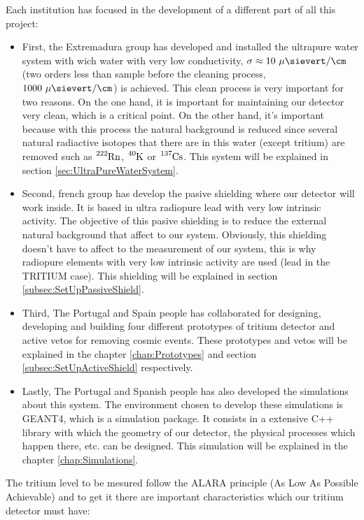 Each institution has focused in the development of a different part of all this project:
\begin{itemize}
\item{} First, the Extremadura group has developed and installed the ultrapure water system with wich water with very low conductivity, $\sigma \approx 10~\mu\sievert/\cm$ (two orders less than sample before the cleaning process, $1000~\mu\sievert/\cm$) is achieved. This clean process is very important for two reasons. On the one hand, it is important for maintaining our detector very clean, which is a critical point. On the other hand, it's important because with this process the natural background is reduced since several natural radiactive isotopes that there are in this water (except tritium) are removed such as $\ce{^{222}Rn}$, $\ce{^{40}K}$ or $\ce{^{137}Cs}$. This system will be explained in section \ref{sec:UltraPureWaterSystem}.

\item{} Second, french group has develop the pasive shielding where our detector will work inside. It is based in ultra radiopure lead with very low intrinsic activity. The objective of this pasive shielding is to reduce the external natural background that affect to our system. Obviously, this shielding doesn't have to affect to the measurement of our system, this is why radiopure elements with very low intrinsic activity are used (lead in the TRITIUM case). This shielding will be explained in section \ref{subsec:SetUpPassiveShield}.

\item{} Third, The Portugal and Spain people has collaborated for designing, developing and building four different prototypes of tritium detector and active vetos for removing cosmic events. These prototypes and vetos will be explained in the chapter \ref{chap:Prototypes} and section \ref{subsec:SetUpActiveShield} respectively.

\item{} Lastly, The Portugal and Spanish people has also developed the simulations about this system. The environment chosen to develop these simulations is GEANT4, which is a simulation package. It consists in a extensive C++ library with which the geometry of our detector, the physical processes which happen there, etc. can be designed. This simulation will be explained in the chapter \ref{chap:Simulations}.

\end{itemize}

The tritium level to be mesured follow the ALARA principle (As Low As Possible Achievable) and to get it there are important characteristics which our tritium detector must have:

